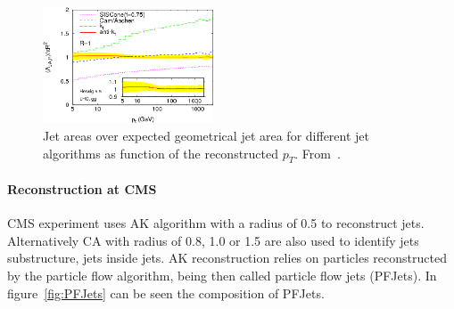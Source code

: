 \begin{figure}[!Hhtbp]
  \begin{center}
    \includegraphics[width=0.45\textwidth]{figs/JetArea.png}
    \caption{Jet areas over expected geometrical jet area for different jet algorithms as function of the reconstructed $p_{T}$. From~\cite{Cacciari:2008gp}.}
    \label{fig:JetsAlgosArea}
  \end{center}
\end{figure}

\paragraph{Reconstruction at CMS}

CMS experiment uses AK algorithm with a radius of 0.5 to reconstruct jets. Alternatively CA with radius of 0.8, 1.0 or 1.5 are also used to identify jets substructure, jets inside jets. AK reconstruction relies on particles reconstructed by the particle flow algorithm, being then called particle flow jets (PFJets). In figure~\ref{fig:PFJets} can be seen the composition of PFJets.  

